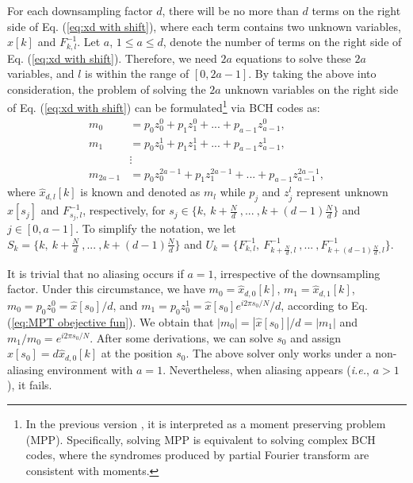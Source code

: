 \documentclass[journal,onecolumn,11pt]{IEEEtran}
\begin{document}
For each downsampling factor $d$, there will be no more than $d$ terms on the right side of Eq. (\ref{eq:xd with shift}), where
each term contains two unknown variables, $\hat{x}[k]$ and $F_{k,l}^{-1}$.
Let $a$, $1\leq a\leq d$, denote the number of terms on the right side of Eq. (\ref{eq:xd with shift}).
Therefore, we need $2a$ equations to solve these $2a$ variables, and $l$ is within the range of $[0,2a-1]$.
By taking the above into consideration, the problem of solving the $2a$ unknown variables on the right side of Eq. (\ref{eq:xd with shift}) can be formulated\footnote{In the previous version \cite{Hsieh2013}, it is interpreted as a moment preserving problem (MPP). Specifically, solving MPP is equivalent to solving complex BCH codes, where the syndromes produced by partial Fourier transform are consistent with moments.} via BCH codes as:
\small
\begin{equation}
\begin{aligned}
    m_{0}&=p_{0}z_{0}^{0}+p_{1}z_{1}^{0}+...+p_{a-1}z_{a-1}^{0}, \\
    m_{1}&=p_{0}z_{0}^{1}+p_{1}z_{1}^{1}+...+p_{a-1}z_{a-1}^{1}, \\
                                                   &\vdots   \\
    m_{2a-1}&=p_{0}z_{0}^{2a-1}+p_{1}z_{1}^{2a-1}+...+p_{a-1}z_{a-1}^{2a-1},
\end{aligned}
\label{eq:MPT obejective fun}
\end{equation}
\normalsize
where $\hat{x}_{d,l}[k]$ is known and denoted as $m_{l}$  while $p_{j}$ and $z_{j}^{l}$ represent unknown $\hat{x}[s_{j}]$ and $F_{s_{j},l}^{-1}$, respectively, for $s_{j} \in \{k, \  k+\frac{N}{d} \  , ...\  ,k+(d-1)\frac{N}{d}\}$ and $j\in [0,a-1]$. To simplify the notation, we let $S_{k}= \{k, \  k+\frac{N}{d} \  , ...\  ,k+(d-1)\frac{N}{d}\}$ and $U_{k}=\{ F_{k,l}^{-1} , \  F_{k+\frac{N}{d},l}^{-1} \  , ...\  ,  F_{k+(d-1)\frac{N}{d},l}^{-1} \}$.

It is trivial that no aliasing occurs if $a=1$, irrespective of the downsampling factor.
Under this circumstance, we have $m_{0}=\hat{x}_{d,0}[k]$, $m_{1}=\hat{x}_{d,1}[k]$, $m_{0}=p_{0}z_{0}^{0}=\hat{x}[s_{0}]/d$, and $m_{1}=p_{0}z_{0}^{1}=\hat{x}[s_{0}]e^{i2\pi s_{0}/N}/d$, according to Eq. (\ref{eq:MPT obejective fun}).
We obtain that $|m_{0}|=|\hat{x}[s_{0}]|/d=|m_{1}|$ and $m_{1}/m_{0}=e^{i2\pi s_{0}/N}$.
After some derivations, we can solve $s_{0}$ and assign $\hat{x}[s_{0}]=d\hat{x}_{d,0}[k]$ at the position $s_0$.
The above solver only works under a non-aliasing environment with $a=1$.
Nevertheless, when aliasing appears ({\em i.e.}, $a>1$), it fails.
\end{document}
